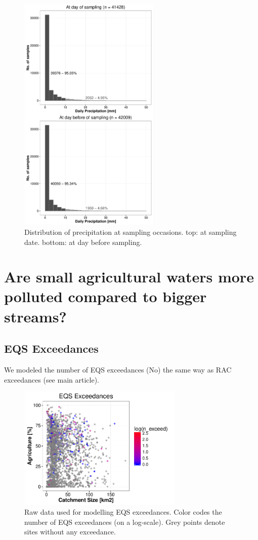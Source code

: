 \documentclass[pdftex,a4paper]{scrreprt}
\begin{document}
\begin{figure}[h]
	\centering
	\includegraphics[width = 0.6\textwidth]{precip}
	\caption{Distribution of precipitation at sampling occasions. top: at sampling date. bottom: at day before sampling.}
	\label{fig:precip}
\end{figure}


\chapter{Are small agricultural waters more polluted compared to bigger streams?}

\section{EQS Exceedances}
We modeled the number of EQS exceedances (No) the same way as RAC exceedances (see main article).


\begin{figure}[h]
	\centering
	\includegraphics[width = 0.7\textwidth]{ezgagrieqs}
	\caption{Raw data used for modelling EQS exceedances. Color codes the number of EQS exceedances (on a log-scale). Grey points denote sites without any exceedance.}
	\label{fig:ezgagrieqs}
\end{figure}
\end{document}
